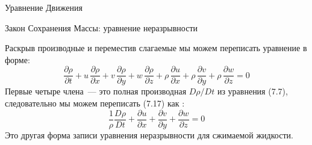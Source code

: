 \begin{chapter}{Уравнение Движения}
\begin{section}{Закон Сохранения Массы: уравнение неразрывности}

Раскрыв производные и переместив слагаемые мы можем переписать
уравнение в форме:
\begin{displaymath}
\frac{\partial{\rho}}{\partial{t}} + u\,\frac{\partial{\rho}}{\partial{x}} + v\,\frac{\partial{\rho}}{\partial{y}} + w\,\frac{\partial{\rho}}{\partial{z}} +
\rho\,\frac{\partial{u}}{\partial{x}} + \rho\,\frac{\partial{v}}{\partial{y}} + \rho\,\frac{\partial{w}}{\partial{z}} = 0
\end{displaymath}
Первые четыре члена~--- это полная производная $D\rho/Dt$ из уравнения
(7.7), следовательно мы можем переписать (7.17) как :
\begin{equation}
\boxed{\frac{1}{\rho}\frac{D\rho}{Dt} + \frac{\partial{u}}{\partial{x}} + \frac{\partial{v}}{\partial{y}} + \frac{\partial{w}}{\partial{z}} = 0}
\end{equation}
Это другая форма записи уравнения неразрывности для сжимаемой жидкости.
%


\end{section}
\end{chapter}
